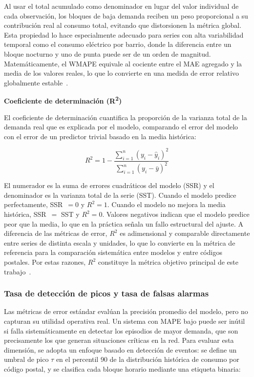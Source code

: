 \documentclass[12pt, a4paper]{article}
\begin{document}
Al usar el total acumulado como denominador en lugar del valor individual de cada observación, los bloques de baja demanda reciben un peso proporcional a su contribución real al consumo total, evitando que distorsionen la métrica global. Esta propiedad lo hace especialmente adecuado para series con alta variabilidad temporal como el consumo eléctrico por barrio, donde la diferencia entre un bloque nocturno y uno de punta puede ser de un orden de magnitud. Matemáticamente, el WMAPE equivale al cociente entre el MAE agregado y la media de los valores reales, lo que lo convierte en una medida de error relativo globalmente estable~\cite{gassar2024, rubattu2023}.

\textbf{Coeficiente de determinación (R\textsuperscript{2})}

El coeficiente de determinación cuantifica la proporción de la varianza total de la demanda real que es explicada por el modelo, comparando el error del modelo con el error de un predictor trivial basado en la media histórica:

\begin{equation}
R^2 = 1 - \frac{\sum_{i=1}^{n}(y_i - \hat{y}_i)^2}{\sum_{i=1}^{n}(y_i - \bar{y})^2}
\end{equation}

El numerador es la suma de errores cuadráticos del modelo (SSR) y el denominador es la varianza total de la serie (SST). Cuando el modelo predice perfectamente, SSR~$= 0$ y $R^2 = 1$. Cuando el modelo no mejora la media histórica, SSR~$=$ SST y $R^2 = 0$. Valores negativos indican que el modelo predice peor que la media, lo que en la práctica señala un fallo estructural del ajuste. A diferencia de las métricas de error, $R^2$ es adimensional y comparable directamente entre series de distinta escala y unidades, lo que lo convierte en la métrica de referencia para la comparación sistemática entre modelos y entre códigos postales. Por estas razones, $R^2$ constituye la métrica objetivo principal de este trabajo~\cite{gassar2024, rubattu2023}.

\subsubsection{Tasa de detección de picos y tasa de falsas alarmas}

Las métricas de error estándar evalúan la precisión promedio del modelo, pero no capturan su utilidad operativa real. Un sistema con MAPE bajo puede ser inútil si falla sistemáticamente en detectar los episodios de mayor demanda, que son precisamente los que generan situaciones críticas en la red. Para evaluar esta dimensión, se adopta un enfoque basado en detección de eventos: se define un umbral de pico $\tau$ en el percentil 90 de la distribución histórica de consumo por código postal, y se clasifica cada bloque horario mediante una etiqueta binaria:
\end{document}
